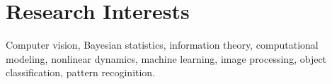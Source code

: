 \section{\sc Research Interests} %
Computer vision, Bayesian statistics, information theory, computational modeling, nonlinear dynamics, machine learning, image processing, object classification, pattern recoginition.
\vspace{1mm}

